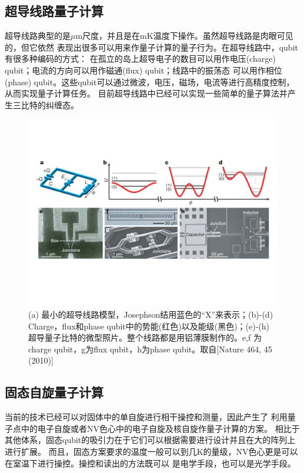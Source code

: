 \subsection{超导线路量子计算}

超导线路典型的是$\mu$m尺度，并且是在mK温度下操作。虽然超导线路是肉眼可见的，但它依然
表现出很多可以用来作量子计算的量子行为\cite{super1,super2,super3,super4}。在超导线路中，qubit有很多种编码的方式：
在孤立的岛上超导电子的数目可以用作电压(charge) qubit；电流的方向可以用作磁通(flux) qubit；线路中的振荡态 可以用作相位(phase) qubit。这些qubit可以通过微波，电压，磁场，电流等进行高精度控制，从而实现量子计算任务。
目前超导线路中已经可以实现一些简单的量子算法\cite{super5}并产生三比特的纠缠态\cite{super6,super7,super8}。

 \begin{figure}[htbp]
            \begin{center}
              \includegraphics[width= 0.8\columnwidth]{figures/super.pdf}
              \caption{(a) 最小的超导线路模型，Josephson结用蓝色的“X”来表示；(b)-(d) Charge，flux和phase qubit中的势能(红色)以及能级(黑色)；(e)-(h) 超导量子比特的微型照片。整个线路都是用铝薄膜制作的。e,f 为charge qubit，g为flux qubit，h为phase qubit。取自[Nature 464, 45 (2010)\cite{review1}]
              }
              \label{super}
            \end{center}
  \end{figure}

  \subsection{固态自旋量子计算}
当前的技术已经可以对固体中的单自旋进行相干操控和测量\cite{solid1,solid2}，因此产生了
利用量子点中的电子自旋\cite{solid3}或者NV色心中的电子自旋及核自旋\cite{solid4}作量子计算的方案。
相比于其他体系，固态qubit的吸引力在于它们可以根据需要进行设计并且在大的阵列上进行扩展。
而且，固态方案要求的温度一般可以到几K的量级，NV色心更是可以在室温下进行操控。操控和读出的方法既可以
是电学手段\cite{solid5}，也可以是光学手段\cite{solid6,solid7,solid8}。

